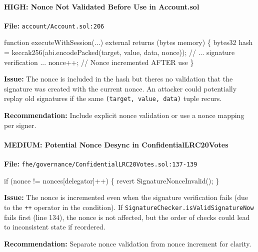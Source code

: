 \documentclass[
]{article}
\newenvironment{Shaded}{}{}
\newcommand{\NormalTok}[1]{#1}
\begin{document}
\paragraph{HIGH: Nonce Not Validated Before Use in
Account.sol}\label{high-nonce-not-validated-before-use-in-accountsol}

\textbf{File:} \texttt{account/Account.sol:206}

\begin{Shaded}
\begin{Highlighting}[]
\NormalTok{function executeWithSession(...) external returns (bytes memory) \{}
\NormalTok{    bytes32 hash = keccak256(abi.encodePacked(target, value, data, nonce));}
\NormalTok{    // ... signature verification ...}
\NormalTok{    nonce++;  // Nonce incremented AFTER use}
\NormalTok{\}}
\end{Highlighting}
\end{Shaded}

\textbf{Issue:} The nonce is included in the hash but
there\textquotesingle s no validation that the signature was created
with the current nonce. An attacker could potentially replay old
signatures if the same \texttt{(target,\ value,\ data)} tuple recurs.

\textbf{Recommendation:} Include explicit nonce validation or use a
nonce mapping per signer.

\paragraph{MEDIUM: Potential Nonce Desync in
ConfidentialLRC20Votes}\label{medium-potential-nonce-desync-in-confidentiallrc20votes}

\textbf{File:}
\texttt{fhe/governance/ConfidentialLRC20Votes.sol:137-139}

\begin{Shaded}
\begin{Highlighting}[]
\NormalTok{if (nonce != nonces[delegator]++) \{}
\NormalTok{    revert SignatureNonceInvalid();}
\NormalTok{\}}
\end{Highlighting}
\end{Shaded}

\textbf{Issue:} The nonce is incremented even when the signature
verification fails (due to the \texttt{++} operator in the condition).
If \texttt{SignatureChecker.isValidSignatureNow} fails first (line 134),
the nonce is not affected, but the order of checks could lead to
inconsistent state if reordered.

\textbf{Recommendation:} Separate nonce validation from nonce increment
for clarity.
\end{document}
